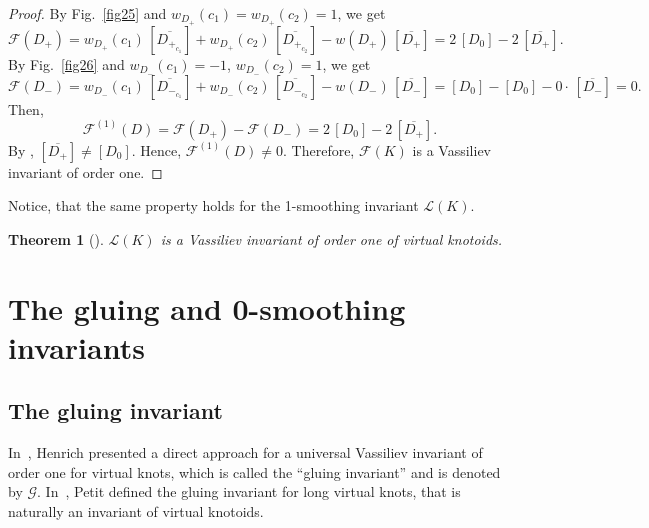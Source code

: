 \documentclass[11pt]{amsart}
\theoremstyle{noparens}
\newtheorem{theorem}{Theorem}[section]
\numberwithin{equation}{section}
\numberwithin{equation}{section}
\begin{document}
\begin{proof}
By Fig.~\ref{fig25} and $w_{D_+} (c_1) = w_{D_+} (c_2) = 1$, we get  
$$ 
\mathcal{F}(D_+) = w_{D_+}(c_{1}) \, [\overline{D_{{+}_{c_1}}}] + w_{D_+}(c_{2})  \, [\overline{D_{{+}_{c_2}}}]  
- w(D_{+}) \, [\overline{D_{+}}]   
= 2 \, [D_{0}] - 2 \, [\overline{D_+}].
$$ 
By Fig.~\ref{fig26} and $w_{D_-} (c_1)=-1$, $w_{D_-}(c_2) = 1$, we get 
$$ 
\mathcal{F}(D_-)  =  w_{D_-}(c_{1}) \, [\overline{D_{{-}_{c_1}}}] + w_{D_-}(c_{2}) \, [\overline{D_{{-}_{c_2}}} ]
- w(D_-) \, [\overline{D_-}] 
 =  [D_0] - [D_0] - 0 \cdot \, [\overline{D_-}]  = 0.
$$ 
Then,
$$ 
\mathcal F^{(1)}(D) = \mathcal{F}(D_+) - \mathcal{F}(D_-) = 2 \, [D_0] - 2 \, [\overline{D_+}]. 
$$
By \cite[Fig.~19]{GK},  $[\overline{D_+}] \neq [D_0]$. Hence, $\mathcal{F}^{(1)}(D) \neq 0$. Therefore, $\mathcal{F} ( K )$ is a Vassiliev invariant of order one. 
\end{proof}

Notice, that the same property holds for the 1-smoothing invariant $\mathcal L(K)$.

\begin{theorem} [\cite{Pet}] \label{th3.5} 
$\mathcal{L}(K)$ is a Vassiliev invariant of order one of virtual knotoids. 
\end{theorem}

\section{The gluing and 0-smoothing invariants} \label{section4}

\subsection{The gluing invariant} In~\cite{Hen}, Henrich presented a direct approach for a universal Vassiliev invariant of order one for virtual knots, which is called the ``gluing invariant'' and is denoted by $\mathcal{G}$. In~\cite{Pet}, Petit defined the gluing invariant for long virtual knots, that is naturally an invariant of virtual knotoids. 
\end{document}
